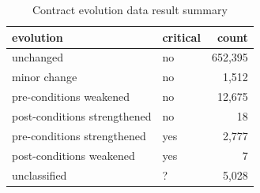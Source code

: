 \begin{table}[]
	\centering
	\caption{Contract evolution data result summary}
	\label{tab:results-evolution}
	\begin{tabular}{|l|l|r|} \hline
		evolution & critical & count \\ \hline
		unchanged & no & 652,395  \\
		minor change & no & 1,512  \\
		pre-conditions weakened & no & 12,675  \\
		post-conditions strengthened & no & 18  \\ \hline
		pre-conditions strengthened & yes & 2,777  \\
		post-conditions weakened & yes & 7  \\ \hline
		unclassified & ? & 5,028  \\ \hline
	\end{tabular}
\end{table}

